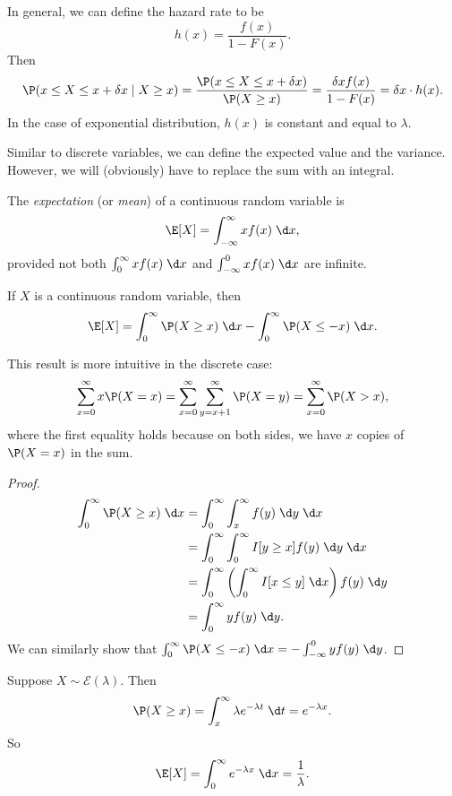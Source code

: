 \documentclass[a4paper]{article}
\begin{document}
In general, we can define the hazard rate to be
\[
  h(x) = \frac{f(x)}{1 - F(x)}.
\]
Then
\[
  \P(x \leq X \leq x + \delta x \mid X \geq x) = \frac{\P(x \leq X \leq x + \delta x)}{\P(X \geq x)} = \frac{\delta x f(x)}{1 - F(x)} = \delta x\cdot h(x).
\]
In the case of exponential distribution, $h(x)$ is constant and equal to $\lambda$.

Similar to discrete variables, we can define the expected value and the variance. However, we will (obviously) have to replace the sum with an integral.
\begin{defi}[Expectation]
  The \emph{expectation} (or \emph{mean}) of a continuous random variable is
  \[
    \E[X] = \int_{-\infty}^\infty xf(x) \;\d x,
  \]
  provided not both $\int_0^\infty xf(x)\;\d x$ and $\int_{-\infty}^0 xf(x) \;\d x$ are infinite.
\end{defi}

\begin{thm}
  If $X$ is a continuous random variable, then
  \[
    \E[X] = \int_0^\infty \P(X \geq x)\;\d x - \int_0^\infty \P(X \leq -x)\;\d x.
  \]
\end{thm}
This result is more intuitive in the discrete case:
\[
  \sum_{x = 0}^\infty x \P(X = x) = \sum_{x = 0}^\infty \sum_{y = x + 1}^\infty \P(X = y) = \sum_{x = 0}^\infty \P(X > x),
\]
where the first equality holds because on both sides, we have $x$ copies of $\P(X = x)$ in the sum.

\begin{proof}
  \begin{align*}
    \int_0^\infty \P(X \geq x)\;\d x &= \int_0^\infty \int_x^\infty f(y)\;\d y\;\d x\\
    &= \int_0^\infty \int_0^\infty I[y\geq x]f(y)\;\d y\;\d x\\
    &= \int_0^\infty \left(\int_0^\infty I[x\leq y]\;\d x\right) f(y)\;\d y\\
    &= \int_0^\infty yf(y)\;\d y.
  \end{align*}
  We can similarly show that $\int_0^\infty \P(X \leq -x)\;\d x = -\int_{-\infty}^0 yf(y)\;\d y$.
\end{proof}

\begin{eg}
  Suppose $X\sim \mathcal{E}(\lambda)$. Then
  \[
    \P(X \geq x) = \int_x^{\infty} \lambda e^{-\lambda t}\;\d t = e^{-\lambda x}.
  \]
  So
  \[
    \E[X] = \int_0^\infty e^{-\lambda x}\;\d x = \frac{1}{\lambda}.
  \]
\end{eg}
\end{document}
